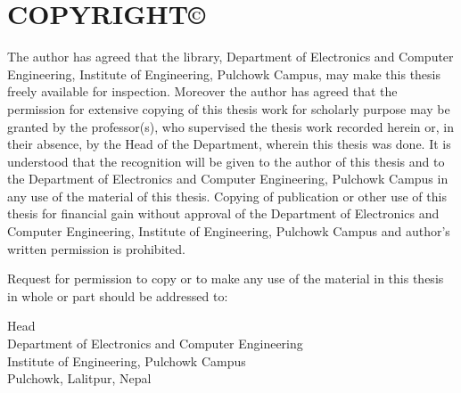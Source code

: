\setcounter{page}{3}
\chapter*{COPYRIGHT\copyright}
The author has agreed that the library, Department of Electronics and Computer
Engineering, Institute of Engineering, Pulchowk Campus, may make this thesis freely
available for inspection. Moreover the author has agreed that the permission for
extensive copying of this thesis work for scholarly purpose may be granted by the
professor(s), who supervised the thesis work recorded herein or, in their absence, by
the Head of the Department, wherein this thesis was done. It is understood that the
recognition will be given to the author of this thesis and to the Department of
Electronics and Computer Engineering, Pulchowk Campus in any use of the material
of this thesis. Copying of publication or other use of this thesis for financial gain
without approval of the Department of Electronics and Computer Engineering,
Institute of Engineering, Pulchowk Campus and author's written permission is
prohibited.\par
Request for permission to copy or to make any use of the material in this thesis in
whole or part should be addressed to:\par
\vspace{1.5cm}
Head\\
Department of Electronics and Computer Engineering\\
Institute of Engineering, Pulchowk Campus\\
Pulchowk, Lalitpur, Nepal
\newpage